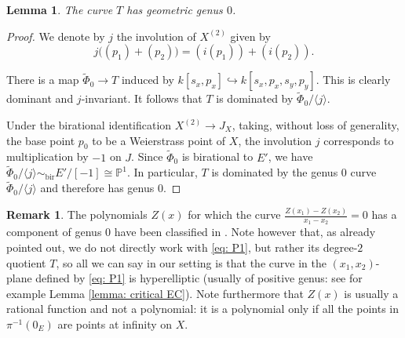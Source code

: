 \documentclass[a4paper,twoside,english]{amsart}
\theoremstyle{plain}
\newtheorem{lemma}[theorem]{Lemma}
\theoremstyle{definition}
\newtheorem{remark}[theorem]{Remark}
\begin{document}
\begin{lemma}
    The curve $T$ has geometric genus $0$.
\end{lemma}
\begin{proof}
We denote by $j$ the involution of $X^{(2)}$ given by
\[
j\bigl((p_1)+(p_2)\bigr)=(i(p_1))+(i(p_2)).
\]

There is a map $\tilde{\Phi}_0 \to T$ induced by $k[s_x, p_x] \hookrightarrow k[s_x, p_x, s_y, p_y]$. 
This is clearly dominant and $j$-invariant.
It follows that $T$ is dominated by $\tilde{\Phi}_0/\langle j\rangle$. 

Under the birational identification $X^{(2)}\rightarrow J_X$, taking, without loss of generality, the base point $p_0$ to be a Weierstrass point of $X$, the involution $j$ corresponds to multiplication by $-1$ on $J$. Since $\tilde{\Phi}_0$ is birational to $E'$, we have
$\tilde{\Phi}_0/\langle j\rangle \sim_{\mathrm{bir}} E'/[-1]\cong \mathbb P^1$. In particular, $T$ is dominated by the genus 0 curve $\tilde{\Phi}_0/\langle j\rangle$ and therefore has genus $0$.
\end{proof}

\begin{remark}
    The polynomials $Z(x)$ for which the curve $\frac{Z(x_1)-Z(x_2)}{x_1-x_2}=0$ has a component of genus $0$ have been classified in \cite{MR2041613}. Note however that, as already pointed out, we do not directly work with \eqref{eq: P1}, but rather its degree-$2$ quotient $T$, so all we can say in our setting is that the curve in the $(x_1,x_2)$-plane defined by \eqref{eq: P1} is hyperelliptic (usually of positive genus: see for example Lemma \ref{lemma: critical EC}). Note furthermore that $Z(x)$ is usually a rational function and not a polynomial: it is a polynomial only if all the points in $\pi^{-1}(0_E)$ are points at infinity on $X$.
\end{remark}
    
\end{document}
